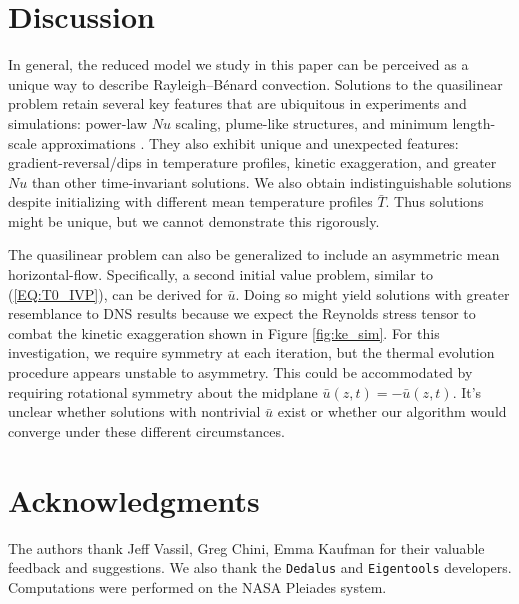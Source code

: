 \documentclass[reprint,amsmath,amssymb,aps]{revtex4-1}
\begin{document}
\section{Discussion}\label{sec:Discussion}
In general, the reduced model we study in this paper can be perceived as a unique way to describe Rayleigh–Bénard convection. Solutions to the quasilinear problem retain several key features that are ubiquitous in experiments and simulations: power-law $Nu$ scaling, plume-like structures, and minimum length-scale approximations \cite{Malkus}. They also exhibit unique and unexpected features: gradient-reversal/dips in temperature profiles, kinetic exaggeration, and greater $Nu$ than other time-invariant solutions. We also obtain indistinguishable solutions despite initializing with different mean temperature profiles $\bar{T}$. Thus solutions might be unique, but we cannot demonstrate this rigorously.
\par The quasilinear problem can also be generalized to include an asymmetric mean horizontal-flow. Specifically, a second initial value problem, similar to (\ref{EQ:T0_IVP}), can be derived for $\bar{u}$. Doing so might yield solutions with greater resemblance to DNS results because we expect the Reynolds stress tensor to combat the kinetic exaggeration shown in Figure \ref{fig:ke_sim}. For this investigation, we require symmetry at each iteration, but the thermal evolution procedure appears unstable to asymmetry. This could be accommodated by requiring rotational symmetry about the midplane $\bar{u}(z, t) = -\bar{u}(z, t)$. It's unclear whether solutions with nontrivial $\bar{u}$ exist or whether our algorithm would converge under these different circumstances.


\section*{Acknowledgments}
The authors thank Jeff Vassil, Greg Chini, Emma Kaufman for their valuable feedback and suggestions. We also thank the \texttt{Dedalus} and \texttt{Eigentools} developers. Computations were performed on the NASA Pleiades system.
\end{document}

